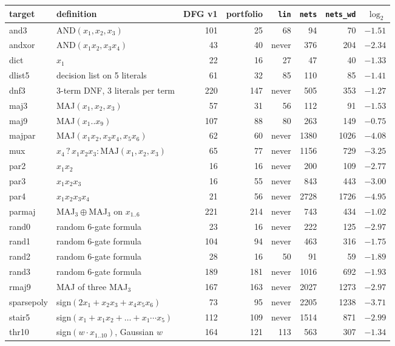 \begin{tabular}{llrrrrrr}
\toprule
target & definition & DFG v1 & portfolio & \texttt{lin} & \texttt{nets} & \texttt{nets\_wd} & $\log_2$\\
\midrule
and3 & AND$(x_1,x_2,x_3)$ & 101 & 25 & 68 & 94 & 70 & $-1.51$\\
andxor & AND$(x_1x_2,x_3x_4)$ & 43 & 40 & never & 376 & 204 & $-2.34$\\
dict & $x_1$ & 22 & 16 & 27 & 47 & 40 & $-1.33$\\
dlist5 & decision list on 5 literals & 61 & 32 & 85 & 110 & 85 & $-1.41$\\
dnf3 & 3-term DNF, 3 literals per term & 220 & 147 & never & 505 & 353 & $-1.27$\\
maj3 & MAJ$(x_1,x_2,x_3)$ & 57 & 31 & 56 & 112 & 91 & $-1.53$\\
maj9 & MAJ$(x_1..x_9)$ & 107 & 88 & 80 & 263 & 149 & $-0.75$\\
majpar & MAJ$(x_1x_2,x_3x_4,x_5x_6)$ & 62 & 60 & never & 1380 & 1026 & $-4.08$\\
mux & $x_4\,?\,x_1x_2x_3:\mathrm{MAJ}(x_1,x_2,x_3)$ & 65 & 77 & never & 1156 & 729 & $-3.25$\\
par2 & $x_1x_2$ & 16 & 16 & never & 200 & 109 & $-2.77$\\
par3 & $x_1x_2x_3$ & 16 & 55 & never & 843 & 443 & $-3.00$\\
par4 & $x_1x_2x_3x_4$ & 21 & 56 & never & 2728 & 1726 & $-4.95$\\
parmaj & MAJ$_3\oplus$MAJ$_3$ on $x_{1..6}$ & 221 & 214 & never & 743 & 434 & $-1.02$\\
rand0 & random 6-gate formula & 23 & 16 & never & 222 & 125 & $-2.97$\\
rand1 & random 6-gate formula & 104 & 94 & never & 463 & 316 & $-1.75$\\
rand2 & random 6-gate formula & 28 & 16 & 50 & 91 & 59 & $-1.89$\\
rand3 & random 6-gate formula & 189 & 181 & never & 1016 & 692 & $-1.93$\\
rmaj9 & MAJ of three MAJ$_3$ & 167 & 163 & never & 2027 & 1273 & $-2.97$\\
sparsepoly & sign$(2x_1+x_2x_3+x_4x_5x_6)$ & 73 & 95 & never & 2205 & 1238 & $-3.71$\\
stair5 & sign$(x_1+x_1x_2+\dots+x_1\cdots x_5)$ & 112 & 109 & never & 1514 & 871 & $-2.99$\\
thr10 & sign$(w\cdot x_{1..10})$, Gaussian $w$ & 164 & 121 & 113 & 563 & 307 & $-1.34$\\
\bottomrule
\end{tabular}
